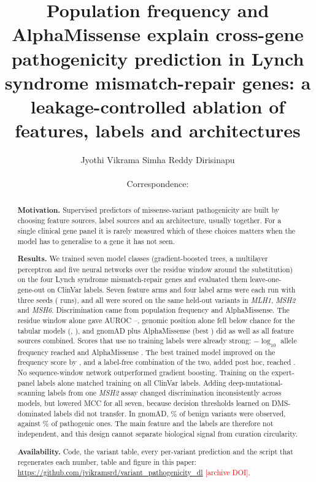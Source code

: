 \documentclass[11pt]{article}
\title{Population frequency and AlphaMissense explain cross-gene pathogenicity prediction
in Lynch syndrome mismatch-repair genes: a leakage-controlled ablation of features,
labels and architectures}
\author{Jyothi Vikrama Simha Reddy Dirisinapu\\
\small \todo{Affiliation}\\
\small Correspondence: \todo{e-mail}}
\date{}
\newcommand{\gene}[1]{\textit{#1}}
\newcommand{\todo}[1]{\textcolor{red}{[#1]}}
\begin{document}
\maketitle

\begin{abstract}
\noindent\textbf{Motivation.} Supervised predictors of missense-variant pathogenicity are
built by choosing feature sources, label sources and an architecture, usually together.
For a single clinical gene panel it is rarely measured which of these choices matters
when the model has to generalise to a gene it has not seen.

\noindent\textbf{Results.} We trained seven model classes (gradient-boosted trees, a
multilayer perceptron and five neural networks over the residue window around the
substitution) on the four Lynch syndrome mismatch-repair genes and evaluated them
leave-one-gene-out on ClinVar labels. Seven feature arms and four label arms were each run
with three seeds (\nCells{} runs), and all were scored on the same \nLabelledScoreable{}
held-out variants in \gene{MLH1}, \gene{MSH2} and \gene{MSH6}. Discrimination came from
population frequency and AlphaMissense. The residue window alone gave AUROC
\aucAZeroCnn--\aucAZeroTransformer, genomic position alone fell below chance for the
tabular models (\aucAFourGbm, \aucAFourMlp), and gnomAD plus AlphaMissense (best
\aucMBilstmAttn) did as well as all feature sources combined. Scores that use no training
labels were already strong: $-\log_{10}$ allele frequency reached \baseNegLogAf{} and
AlphaMissense \baseAlphamissense. The best trained model improved on the frequency score by
\dAucMBilstmAttnVsNegLogAfAbs, and a label-free combination of the two, added post hoc,
reached \baseRankMean. No
sequence-window network outperformed gradient boosting. Training on the \nExpert{}
expert-panel labels alone matched training on all \nLabelled{} ClinVar labels. Adding
\nDms{} deep-mutational-scanning labels from one \gene{MSH2} assay changed discrimination
inconsistently across models, but lowered MCC for all seven, because decision thresholds
learned on DMS-dominated labels did not transfer. In gnomAD, \benignObservedPct\% of benign
variants were observed, against \pathObservedPct\% of pathogenic ones. The main feature
and the labels are therefore not independent, and this design cannot separate biological
signal from curation circularity.

\noindent\textbf{Availability.} Code, the variant table, every per-variant prediction and
the script that regenerates each number, table and figure in this paper:
\url{https://github.com/jvikramsrd/variant_pathogenicity_dl} \todo{archive DOI}.
\end{abstract}
\end{document}

